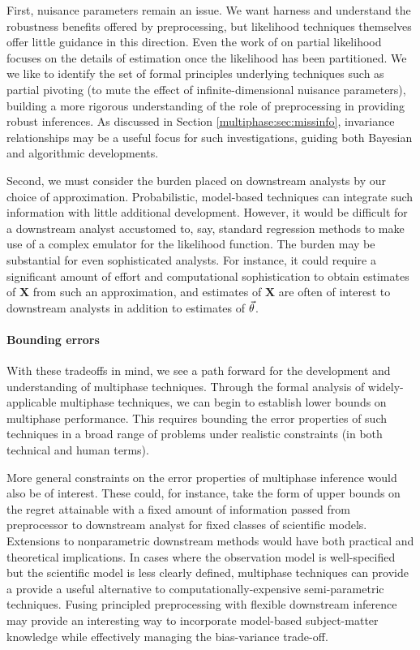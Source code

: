 First, nuisance parameters remain an issue.
We want harness and understand the robustness benefits offered by preprocessing, but likelihood techniques themselves offer little guidance in this direction.
Even the work of \citet{Cox1975} on partial likelihood focuses on the details of estimation once the likelihood has been partitioned.
We we like to identify the set of formal principles underlying techniques such as partial pivoting (to mute the effect of infinite-dimensional nuisance parameters), building a more rigorous understanding of the role of preprocessing in providing robust inferences.
As discussed in Section \ref{multiphase:sec:missinfo}, invariance relationships may be a useful focus for such investigations, guiding both Bayesian and algorithmic developments.

Second, we must consider the burden placed on downstream analysts by our choice of approximation.
Probabilistic, model-based techniques can integrate such information with little additional development.
However, it would be difficult for a downstream analyst accustomed to, say, standard regression methods to make use of a complex emulator for the likelihood function.
The burden may be substantial for even sophisticated analysts.
For instance, it could require a significant amount of effort and computational sophistication to obtain estimates of $\bm X$ from such an approximation, and estimates of $\bm X$ are often of interest to downstream analysts in addition to estimates of $\vec {\theta}$.

\paragraph{Bounding errors}
With these tradeoffs in mind, we see a path forward for the development and understanding of multiphase techniques.
Through the formal analysis of widely-applicable multiphase techniques, we can begin to establish lower bounds on multiphase performance.
This requires bounding the error properties of such techniques in a broad range of problems under realistic constraints (in both technical and human terms).

More general constraints on the error properties of multiphase inference would also be of interest.
These could, for instance, take the form of upper bounds on the regret attainable with a fixed amount of information passed from preprocessor to downstream analyst for fixed classes of scientific models.
Extensions to nonparametric downstream methods would have both practical and theoretical implications.
In cases where the observation model is well-specified but the scientific model is less clearly defined, multiphase techniques can provide a provide a useful alternative to computationally-expensive semi-parametric techniques.
Fusing principled preprocessing with flexible downstream inference may provide an interesting way to incorporate model-based subject-matter knowledge while effectively managing the bias-variance trade-off.


